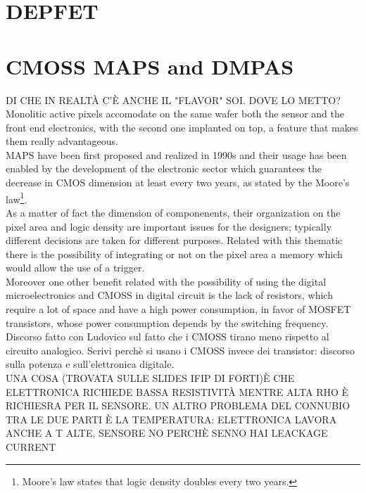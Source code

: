 \section{DEPFET}


\section{CMOSS MAPS and DMPAS}
   DI CHE IN REALTÀ C'È ANCHE IL "FLAVOR" SOI. DOVE LO METTO?\\
   Monolitic active pixels accomodate on the same wafer both the sensor and the front end electronics, with the second one implanted on top, a feature that makes them really advantageous. \\
   MAPS have been first proposed and realized in 1990s and their usage has been enabled by the development of the electronic sector which guarantees the decrease in CMOS dimension at least every two years, as stated by the Moore's law\footnote{Moore's law states that logic density doubles every two years.}.\\
   As a matter of fact the dimension of componenents, their organization on the pixel area and logic density are important issues for the designers; typically different decisions are taken for different purposes. Related with this thematic there is the possibility of integrating or not on the pixel area a memory which would allow the use of a trigger. \\ 
   Moreover one other benefit related with the possibility of using the digital microelectronics
   and CMOSS in digital circuit is the lack of resistors, which require a lot of
   space and have a high power consumption, in favor of MOSFET transistors, whose power
   consumption depends by the switching frequency. Discorso fatto con Ludovico
   sul fatto che i CMOSS tirano meno rispetto al circuito analogico.
   Scrivi perchè si usano i CMOSS invece dei transistor: discorso sulla potenza e sull'elettronica digitale.\\
   UNA COSA (TROVATA SULLE SLIDES IFIP DI FORTI)È CHE ELETTRONICA RICHIEDE BASSA RESISTIVITÀ MENTRE ALTA RHO È RICHIESRA PER IL SENSORE. UN ALTRO PROBLEMA DEL CONNUBIO TRA LE DUE PARTI È LA TEMPERATURA: ELETTRONICA LAVORA ANCHE A T ALTE, SENSORE NO PERCHÈ SENNO HAI LEACKAGE CURRENT\\

